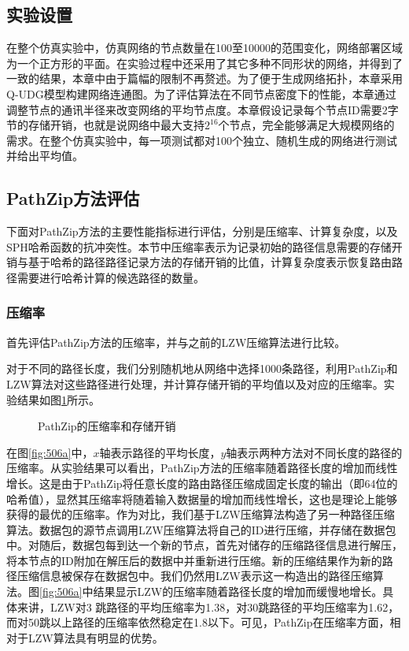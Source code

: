 \subsection{实验设置}
在整个仿真实验中，仿真网络的节点数量在100至10000的范围变化，网络部署区域为一个正方形的平面。在实验过程中还采用了其它多种不同形状的网络，并得到了一致的结果，本章中由于篇幅的限制不再赘述。为了便于生成网络拓扑，本章采用Q-UDG模型构建网络连通图。为了评估算法在不同节点密度下的性能，本章通过调整节点的通讯半径来改变网络的平均节点度。本章假设记录每个节点ID需要2字节的存储开销，也就是说网络中最大支持$2^{16}$个节点，完全能够满足大规模网络的需求。在整个仿真实验中，每一项测试都对100个独立、随机生成的网络进行测试并给出平均值。
\subsection{PathZip方法评估}
下面对PathZip方法的主要性能指标进行评估，分别是压缩率、计算复杂度，以及SPH哈希函数的抗冲突性。本节中压缩率表示为记录初始的路径信息需要的存储开销与基于哈希的路径路径记录方法的存储开销的比值，计算复杂度表示恢复路由路径需要进行哈希计算的候选路径的数量。
\subsubsection{压缩率}
首先评估PathZip方法的压缩率，并与之前的LZW压缩算法进行比较。

对于不同的路径长度，我们分别随机地从网络中选择1000条路径，利用PathZip和LZW算法对这些路径进行处理，并计算存储开销的平均值以及对应的压缩率。实验结果如图\ref{fig:506}所示。
\begin{figure}[t]
  \centering
  \hspace{0.5em}
  \caption{PathZip的压缩率和存储开销}
  \label{fig:506}
\end{figure}

在图\ref{fig:506a}中，$x$轴表示路径的平均长度，$y$轴表示两种方法对不同长度的路径的压缩率。从实验结果可以看出，PathZip方法的压缩率随着路径长度的增加而线性增长。这是由于PathZip将任意长度的路由路径压缩成固定长度的输出（即64位的哈希值），显然其压缩率将随着输入数据量的增加而线性增长，这也是理论上能够获得的最优的压缩率。作为对比，我们基于LZW压缩算法构造了另一种路径压缩算法。数据包的源节点调用LZW压缩算法将自己的ID进行压缩，并存储在数据包中。对随后，数据包每到达一个新的节点，首先对储存的压缩路径信息进行解压，将本节点的ID附加在解压后的数据中并重新进行压缩。新的压缩结果作为新的路径压缩信息被保存在数据包中。我们仍然用LZW表示这一构造出的路径压缩算法。图\ref{fig:506a}中结果显示LZW的压缩率随着路径长度的增加而缓慢地增长。具体来讲，LZW对3 跳路径的平均压缩率为1.38，对30跳路径的平均压缩率为1.62，而对50跳以上路径的压缩率依然稳定在1.8以下。可见，PathZip在压缩率方面，相对于LZW算法具有明显的优势。


